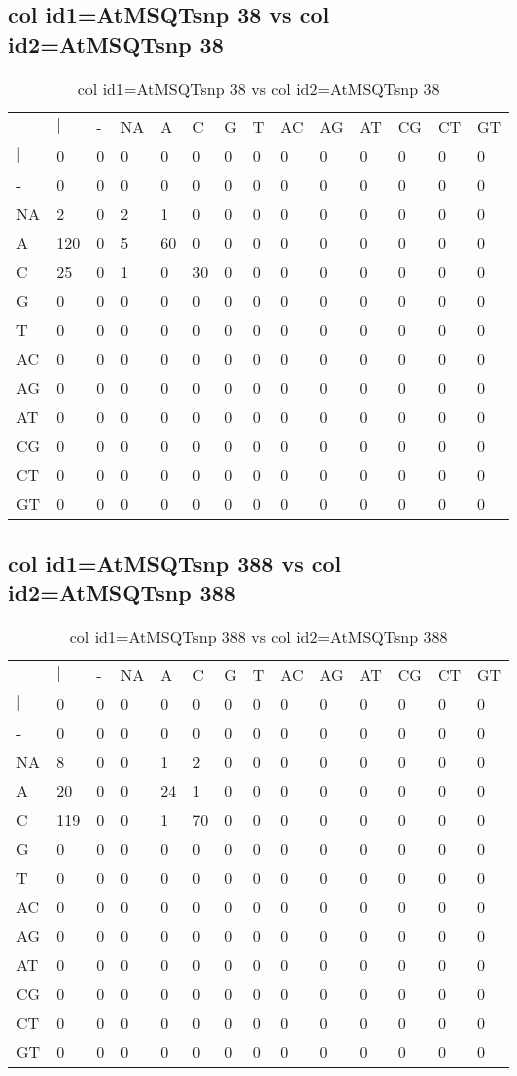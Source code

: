 \subsection{col id1=AtMSQTsnp 38 vs col id2=AtMSQTsnp 38}
\begin{center}
\begin{longtable}{|l|l|l|l|l|l|l|l|l|l|l|l|l|l|}
\caption{col id1=AtMSQTsnp 38 vs col id2=AtMSQTsnp 38} \label{table_dm704}\\
\hline
\\
\hline
&$|$&-&NA&A&C&G&T&AC&AG&AT&CG&CT&GT\\
$|$&0&0&0&0&0&0&0&0&0&0&0&0&0\\
-&0&0&0&0&0&0&0&0&0&0&0&0&0\\
NA&2&0&2&1&0&0&0&0&0&0&0&0&0\\
A&120&0&5&60&0&0&0&0&0&0&0&0&0\\
C&25&0&1&0&30&0&0&0&0&0&0&0&0\\
G&0&0&0&0&0&0&0&0&0&0&0&0&0\\
T&0&0&0&0&0&0&0&0&0&0&0&0&0\\
AC&0&0&0&0&0&0&0&0&0&0&0&0&0\\
AG&0&0&0&0&0&0&0&0&0&0&0&0&0\\
AT&0&0&0&0&0&0&0&0&0&0&0&0&0\\
CG&0&0&0&0&0&0&0&0&0&0&0&0&0\\
CT&0&0&0&0&0&0&0&0&0&0&0&0&0\\
GT&0&0&0&0&0&0&0&0&0&0&0&0&0\\
\hline
\end{longtable}
\end{center}

\subsection{col id1=AtMSQTsnp 388 vs col id2=AtMSQTsnp 388}
\begin{center}
\begin{longtable}{|l|l|l|l|l|l|l|l|l|l|l|l|l|l|}
\caption{col id1=AtMSQTsnp 388 vs col id2=AtMSQTsnp 388} \label{table_dm706}\\
\hline
\\
\hline
&$|$&-&NA&A&C&G&T&AC&AG&AT&CG&CT&GT\\
$|$&0&0&0&0&0&0&0&0&0&0&0&0&0\\
-&0&0&0&0&0&0&0&0&0&0&0&0&0\\
NA&8&0&0&1&2&0&0&0&0&0&0&0&0\\
A&20&0&0&24&1&0&0&0&0&0&0&0&0\\
C&119&0&0&1&70&0&0&0&0&0&0&0&0\\
G&0&0&0&0&0&0&0&0&0&0&0&0&0\\
T&0&0&0&0&0&0&0&0&0&0&0&0&0\\
AC&0&0&0&0&0&0&0&0&0&0&0&0&0\\
AG&0&0&0&0&0&0&0&0&0&0&0&0&0\\
AT&0&0&0&0&0&0&0&0&0&0&0&0&0\\
CG&0&0&0&0&0&0&0&0&0&0&0&0&0\\
CT&0&0&0&0&0&0&0&0&0&0&0&0&0\\
GT&0&0&0&0&0&0&0&0&0&0&0&0&0\\
\hline
\end{longtable}
\end{center}

